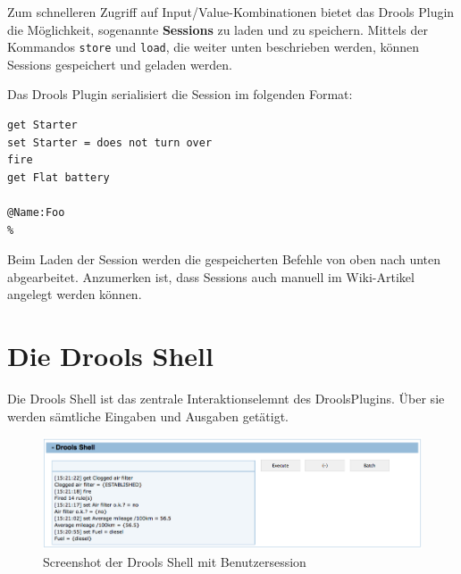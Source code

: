 \documentclass[a4paper,12pt]{report}
\begin{document}
Zum schnelleren Zugriff auf Input/Value-Kombinationen bietet das Drools Plugin die Möglichkeit, sogenannte \textbf{Sessions} zu laden und zu speichern.
Mittels der Kommandos \texttt{store} und \texttt{load}, die weiter unten beschrieben werden, können Sessions gespeichert und
geladen werden.

Das Drools Plugin serialisiert die Session im folgenden Format:

\begin{lstlisting}[caption=Beispiel DroolsSessionSection]
%%DroolsSession
get Starter
set Starter = does not turn over
fire
get Flat battery

@Name:Foo
%
\end{lstlisting}

Beim Laden der Session werden die gespeicherten Befehle von oben nach unten abgearbeitet. Anzumerken ist, dass Sessions
auch manuell im Wiki-Artikel angelegt werden können.

  \section{Die Drools Shell}

Die Drools Shell ist das zentrale Interaktionselemnt des DroolsPlugins. Über sie werden sämtliche Eingaben und Ausgaben getätigt.
  
  \begin{figure}[htbp]
    \centering
      \includegraphics[width=\textwidth]{img/shell.png}
    \caption{Screenshot der Drools Shell mit Benutzersession}
    \label{fig:screen_shell}
  \end{figure}
\end{document}
